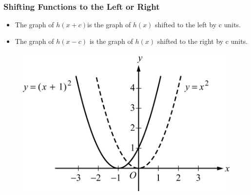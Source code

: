 \documentclass[
	11pt, %
]{beamer}
\begin{document}

\begin{frame}
	\frametitle{Shifting Functions to the Left or Right}
	\begin{theorem}
		\begin{itemize}
			\item The graph of $h(x+c) $is the graph of $h(x)$ shifted to the \alert{left} by c units. 
			\item The graph of $h(x-c)$ is the graph of $h(x)$ shifted to the \alert{right} by c units.
		\end{itemize}
	\end{theorem}
	

	\begin{figure}
		\includegraphics[width=0.5\linewidth]{Shifting_Function2.jpg} 
	\end{figure}
	
\end{frame}
\end{document}
